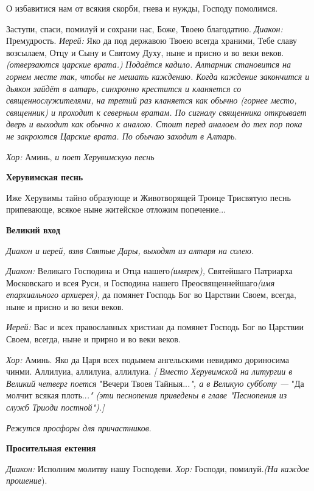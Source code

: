   О избавитися нам от всякия скорби, гнева и нужды, Господу помолимся. 

  Заступи, спаси, помилуй и сохрани нас, Боже, Твоею благодатию. 
{\itshape 
  Диакон:} Премудрость. 
{\itshape 
  Иерей:} Яко да под державою Твоею всегда храними, Тебе славу возсылаем, Отцу и Сыну и Святому Духу, ныне и присно и во веки веков. 
 {\itshape (отверзаются царские врата.)}
 {\itshape Подаётся кадило. Алтарник становится на горнем месте так, чтобы не мешать каждению. Когда каждение закончится и дьякон зайдёт в алтарь, синхронно крестится и кланяется со священнослужителями, на третий раз кланяется как обычно (горнее место, священник) и проходит к северным вратам. По сигналу священника открывает дверь и выходит как обычно к аналою. Стоит перед аналоем до тех пор пока не закроются Царские врата. По обычаю заходит в Алтарь}. 

{\itshape  Хор:} Аминь, {\itshape и поет Херувимскую песнь }

 {\bfseries Херувимская песнь }

  Иже Херувимы тайно образующе и Животворящей Троице Трисвятую песнь припевающе, всякое ныне житейское отложим попечение... 

{\bfseries  Великий вход }

{\itshape  Диакон и иерей, взяв Святые Дары, выходят из алтаря на солею.}

{\itshape  Диакон:} Великаго Господина и Отца нашего{\itshape  (имярек),} Святейшаго Патриарха Московскаго и всея Руси, и Господина нашего Преосвященнейшаго{\itshape  (имя епархиального архиерея),} да помянет Господь Бог во Царствии Своем, всегда, ныне и присно и во веки веков.

{\itshape  Иерей:} Вас и всех православных христиан да помянет Господь Бог во Царствии Своем, всегда, ныне и прирно и во веки веков.

{\itshape Хор:} Аминь. Яко да Царя всех подымем ангельскими невидимо дориносима чинми. Аллилуиа, аллилуиа, аллилуиа.
 {\itshape  [ Вместо Херувимской на литургии в Великий четверг поется }"Вечери Твоея Тайныя..{\itshape .", а в Великую субботу — }"Да молчит всякая плоть..{\itshape ." (эти песнопения приведены в главе "Песнопения из служб Триоди постной").]}

{\itshape  Режутся просфоры для причастников}. 

 {\bfseries Просительная ектения }

{\itshape  Диакон:} Исполним молитву нашу Господеви. 
{\itshape 
  Хор:} Господи, помилуй.{\itshape  (На каждое прошение}). 

